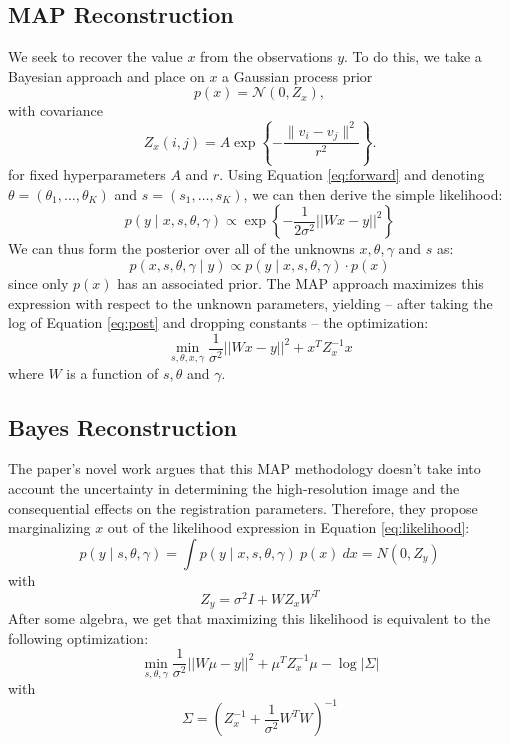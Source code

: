 \documentclass[twocolumn]{article}
\begin{document}
\subsection{MAP Reconstruction}
We seek to recover the value $x$ from the observations $y$. To do this, we take a Bayesian approach and place on $x$ a Gaussian process prior
\[
p(x) = \mathcal{N}(0, Z_x),
\]
with covariance
\[
Z_x(i,j)
=
A \exp\left\{
-\frac{\lVert v_i - v_j \rVert^2}{r^2}
\right\}.
\]
for fixed hyperparameters $A$ and $r$.
Using Equation \ref{eq:forward} and denoting $\theta = (\theta_1,\ldots,\theta_K)$ and $s = (s_1,\ldots,s_K)$, we can then derive the simple likelihood:
\begin{equation}
    p(y \mid x, s, \theta, \gamma) \propto \exp\left\{ -\frac{1}{2\sigma^2}||Wx - y||^2\right\}
    \label{eq:likelihood}
\end{equation}
We can thus form the posterior over all of the unknowns $x, \theta, \gamma$ and $s$ as:
\begin{equation}
    p(x, s, \theta, \gamma \mid y) \propto p(y \mid x, s, \theta, \gamma) \cdot p(x)
    \label{eq:post}
\end{equation}
since only $p(x)$ has an associated prior. The MAP approach maximizes this expression with respect to the unknown parameters, yielding -- after taking the log of Equation \ref{eq:post} and dropping constants -- the optimization: 
\begin{equation}
    \min_{s, \theta, x, \gamma} \frac{1}{\sigma^2} ||Wx - y||^2 + x^T Z_x^{-1}x
    \label{eq:opt1}
\end{equation}
where $W$ is a function of $s, \theta$ and $\gamma$. 

\subsection{Bayes Reconstruction}
The paper's novel work argues that this MAP methodology doesn't take into account the uncertainty in determining the high-resolution image and the consequential effects on the registration parameters. Therefore, they propose marginalizing $x$ out of the likelihood expression in Equation \ref{eq:likelihood}: 
\begin{equation*}
    p(y \mid s, \theta, \gamma) = \int p(y \mid x, s, \theta, \gamma) \ p(x) \ dx = N(0, Z_y)
\end{equation*}
with 
\[
Z_y = \sigma^2I + WZ_xW^T
\]
After some algebra, we get that maximizing this likelihood is equivalent to the following optimization:
\begin{equation}
    \min_{s, \theta,\gamma} \frac{1}{\sigma^2} ||W\mu - y||^2 + \mu^TZ_x^{-1}\mu - \log{|\Sigma|}
\end{equation}
with 
\[
\Sigma
=
\left(
Z_x^{-1}
+
\frac{1}{\sigma^2} W^T W
\right)^{-1}
\]
\end{document}

